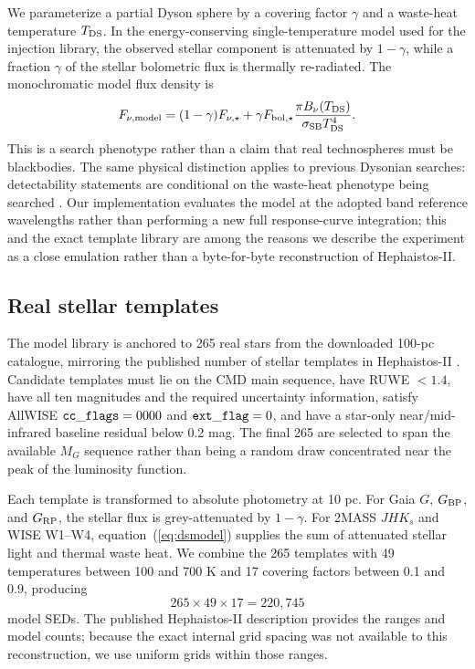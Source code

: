 \documentclass[fleqn,usenatbib]{mnras}
\begin{document}
We parameterize a partial Dyson sphere by a covering factor $\gamma$ and a waste-heat temperature $T_{\rm DS}$. In the energy-conserving single-temperature model used for the injection library, the observed stellar component is attenuated by $1-\gamma$, while a fraction $\gamma$ of the stellar bolometric flux is thermally re-radiated. The monochromatic model flux density is
\begin{equation}
F_{\nu,{\rm model}}=(1-\gamma)F_{\nu,\star}
+\gamma F_{{\rm bol},\star}
\frac{\pi B_\nu(T_{\rm DS})}{\sigma_{\rm SB}T_{\rm DS}^4}.
\label{eq:dsmodel}
\end{equation}
This is a search phenotype rather than a claim that real technospheres must be blackbodies. The same physical distinction applies to previous Dysonian searches: detectability statements are conditional on the waste-heat phenotype being searched \citep{Wright2014b,Suazo2022}. Our implementation evaluates the model at the adopted band reference wavelengths rather than performing a new full response-curve integration; this and the exact template library are among the reasons we describe the experiment as a close emulation rather than a byte-for-byte reconstruction of Hephaistos-II.

\subsection{Real stellar templates}

The model library is anchored to 265 real stars from the downloaded 100-pc catalogue, mirroring the published number of stellar templates in Hephaistos-II \citep{Suazo2024}. Candidate templates must lie on the CMD main sequence, have RUWE $<1.4$, have all ten magnitudes and the required uncertainty information, satisfy AllWISE ${\tt cc\_flags}=0000$ and ${\tt ext\_flag}=0$, and have a star-only near/mid-infrared baseline residual below 0.2 mag. The final 265 are selected to span the available $M_G$ sequence rather than being a random draw concentrated near the peak of the luminosity function.

Each template is transformed to absolute photometry at 10 pc. For Gaia $G$, $G_{\rm BP}$, and $G_{\rm RP}$, the stellar flux is grey-attenuated by $1-\gamma$. For 2MASS $JHK_s$ and WISE W1--W4, equation~(\ref{eq:dsmodel}) supplies the sum of attenuated stellar light and thermal waste heat. We combine the 265 templates with 49 temperatures between 100 and 700 K and 17 covering factors between 0.1 and 0.9, producing
\begin{equation}
265\times49\times17=220,745
\end{equation}
model SEDs. The published Hephaistos-II description provides the ranges and model counts; because the exact internal grid spacing was not available to this reconstruction, we use uniform grids within those ranges.
\end{document}
